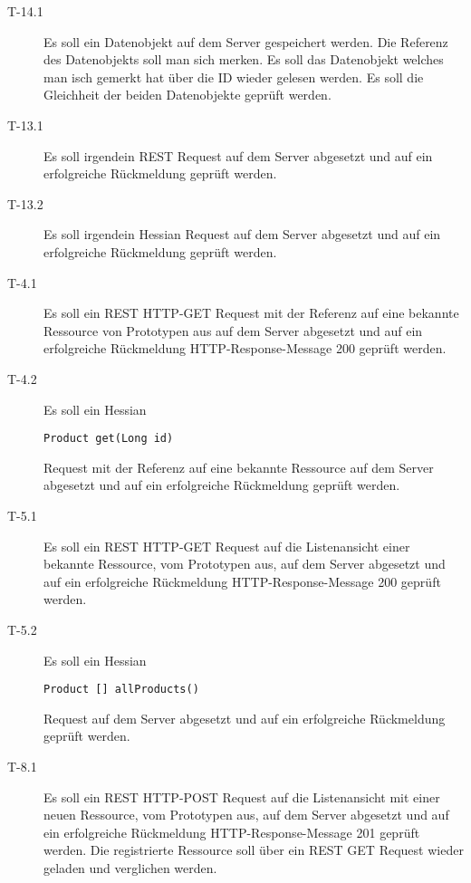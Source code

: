\documentclass[listof=totocnumbered, bibliography=totocnumbered]{scrreprt}
\begin{document}
  \begin{description}

    \item[T-14.1] Es soll ein Datenobjekt auf dem Server gespeichert werden.
    Die Referenz des Datenobjekts soll man sich merken. Es soll das Datenobjekt
    welches man isch gemerkt hat über die ID wieder gelesen werden. Es soll die
    Gleichheit der beiden Datenobjekte geprüft werden.

    \item[T-13.1] Es soll irgendein \ac{REST} Request auf dem Server abgesetzt
    und auf ein erfolgreiche Rückmeldung geprüft werden.
    
    \item[T-13.2] Es soll irgendein Hessian Request auf dem Server abgesetzt
    und auf ein erfolgreiche Rückmeldung geprüft werden.
    
    \item[T-4.1] Es soll ein \ac{REST} HTTP-GET Request mit der Referenz
    auf eine bekannte Ressource von Prototypen aus auf dem Server abgesetzt und
    auf ein erfolgreiche Rückmeldung HTTP-Response-Message 200 geprüft werden.
    
    \item[T-4.2] Es soll ein Hessian 
    \begin{verbatim}Product get(Long id)\end{verbatim} 
    Request mit der Referenz auf eine bekannte Ressource auf dem Server
    abgesetzt und auf ein erfolgreiche Rückmeldung geprüft werden.
    
    \item[T-5.1] Es soll ein \ac{REST} HTTP-GET Request auf die
    Listenansicht einer bekannte Ressource, vom Prototypen aus, auf dem Server
    abgesetzt und auf ein erfolgreiche Rückmeldung HTTP-Response-Message 200
    geprüft werden.
    
    \item[T-5.2] Es soll ein Hessian 
    \begin{verbatim}Product [] allProducts()\end{verbatim}
    Request auf dem Server abgesetzt und auf ein erfolgreiche Rückmeldung
    geprüft werden.
    
    \item[T-8.1] Es soll ein \ac{REST} HTTP-POST Request auf die
    Listenansicht mit einer neuen Ressource, vom Prototypen aus,
    auf dem Server abgesetzt und auf ein erfolgreiche Rückmeldung
    HTTP-Response-Message 201 geprüft werden. Die registrierte Ressource soll
    über ein \ac{REST} GET Request wieder geladen und verglichen werden.


\end{description}
\end{document}
